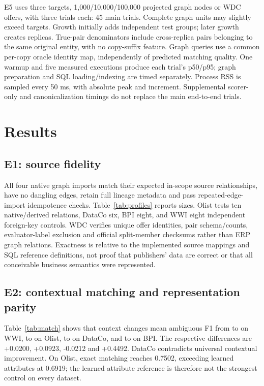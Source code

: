 \documentclass[11pt,letterpaper]{article}
\begin{document}
E5 uses three targets, 1,000/10,000/100,000 projected graph nodes or WDC offers, with three trials each: 45 main trials. Complete graph units may slightly exceed targets. Growth initially adds independent test groups; later growth creates replicas. True-pair denominators include cross-replica pairs belonging to the same original entity, with no copy-suffix feature. Graph queries use a common per-copy oracle identity map, independently of predicted matching quality. One warmup and five measured executions produce each trial's p50/p95; graph preparation and SQL loading/indexing are timed separately. Process RSS is sampled every 50 ms, with absolute peak and increment. Supplemental scorer-only and canonicalization timings do not replace the main end-to-end trials.

\section{Results}
\subsection{E1: source fidelity}
All four native graph imports match their expected in-scope source relationships, have no dangling edges, retain full lineage metadata and pass repeated-edge-import idempotence checks. Table~\ref{tab:profiles} reports sizes. Olist tests ten native/derived relations, DataCo six, BPI eight, and WWI eight independent foreign-key controls. WDC verifies unique offer identities, pair schema/counts, evaluator-label exclusion and official split-member checksums rather than ERP graph relations. Exactness is relative to the implemented source mappings and SQL reference definitions, not proof that publishers' data are correct or that all conceivable business semantics were represented.

\subsection{E2: contextual matching and representation parity}
\begin{table}[t]\centering\small
\caption{Mean F1 over three seeds on common attribute-defined ambiguous candidates. These are conditional pair results; generic and WWI ablations have the distinctions specified in Section 6.}\label{tab:match}\end{table}
Table~\ref{tab:match} shows that context changes mean ambiguous F1 from \FWwiAttr{} to \FWwiGraph{} on WWI, \FOlistAttr{} to \FOlistGraph{} on Olist, \FDataCoAttr{} to \FDataCoGraph{} on DataCo, and \FBpiAttr{} to \FBpiGraph{} on BPI. The respective differences are +0.0200, +0.0923, -0.0212 and +0.4492. DataCo contradicts universal contextual improvement. On Olist, exact matching reaches 0.7502, exceeding learned attributes at 0.6919; the learned attribute reference is therefore not the strongest control on every dataset.
\end{document}
